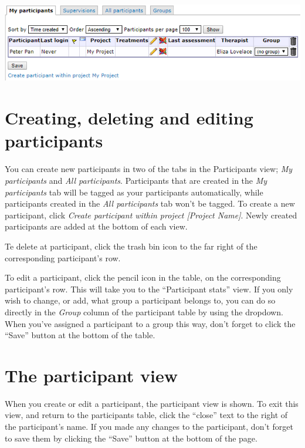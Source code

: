 \documentclass[]{book}
\begin{document}
\includegraphics{images/new-images/participantsTabs.png}

\hypertarget{creating-deleting-and-editing-participants}{%
\section{Creating, deleting and editing participants}\label{creating-deleting-and-editing-participants}}

You can create new participants in two of the tabs in the Participants view; \emph{My participants} and \emph{All participants}. Participants that are created in the \emph{My participants} tab will be tagged as your participants automatically, while participants created in the \emph{All participants} tab won't be tagged.
To create a new participant, click \emph{Create participant within project {[}Project Name{]}}. Newly created participants are added at the bottom of each view.

Te delete at participant, click the trash bin icon to the far right of the corresponding participant's row.

To edit a participant, click the pencil icon in the table, on the corresponding participant's row. This will take you to the ``Participant stats'' view.
If you only wish to change, or add, what group a participant belongs to, you can do so directly in the \emph{Group} column of the participant table by using the dropdown. When you've assigned a participant to a group this way, don't forget to click the ``Save'' button at the bottom of the table.

\hypertarget{the-participant-view}{%
\section{The participant view}\label{the-participant-view}}

When you create or edit a participant, the participant view is shown. To exit this view, and return to the participants table, click the ``close'' text to the right of the participant's name. If you made any changes to the participant, don't forget to save them by clicking the ``Save'' button at the bottom of the page.
\end{document}
